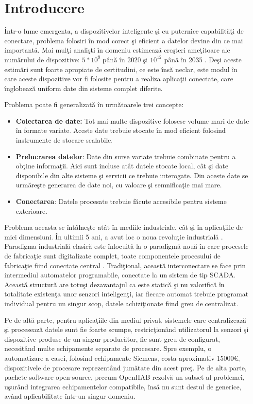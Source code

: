 \chapter{Introducere}

Într-o lume emergenta, a dispozitivelor inteligente şi cu puternice capabilităţi de conectare, problema folosiri în mod corect şi eficient a datelor devine din ce mai importantă. Mai mulţi analişti în domeniu estimează creşteri ameţitoare ale numărului de dispozitive: $5*10^9$ până în 2020 şi $10^{12}$ până în 2035 \autocite{iotGrowth}. Deşi aceste estimări sunt foarte apropiate de certitudini, ce este însă neclar, este modul în care aceste dispozitive vor fi folosite pentru a realiza aplicaţii conectate, care înglobează uniform date din sisteme complet diferite.

Problema poate fi generalizată în următoarele trei concepte:
\begin{itemize}
	\item  \textbf{Colectarea de date:} Tot mai multe dispozitive folosesc volume mari de date în formate variate. Aceste date trebuie stocate în mod eficient folosind instrumente de stocare scalabile. 
	\item \textbf{Prelucrarea datelor}: Date din surse variate trebuie combinate pentru a obţine informaţii. Aici sunt incluse atât datele stocate local, cât şi date disponibile din alte sisteme şi servicii ce trebuie interogate. Din aceste date se urmăreşte generarea de date noi, cu valoare şi semnificaţie mai mare.
	\item \textbf{Conectarea}: Datele procesate trebuie făcute accesibile pentru sisteme exterioare.
\end{itemize}

Problema aceasta se întâlneşte atât în mediile industriale, cât şi în aplicaţiile de mici dimensiuni. 
În ultimii 5 ani, a avut loc o noua revoluţie industrială \autocite{ptc} . Paradigma industrială clasică este înlocuită la o paradigmă nouă în care procesele de fabricaţie sunt digitalizate complet, toate componentele procesului de fabricaţie fiind conectate central \autocite{deloitteReport}. 
Tradiţional, această interconectare se face prin intermediul automatelor programabile, conectate la un sistem de tip SCADA. Această structură are totuşi dezavantajul ca este statică şi nu valorifică în totalitate existenţa unor senzori inteligenţi, iar fiecare automat trebuie programat individual pentru un singur scop, datele achiziţionate fiind greu de centralizat.

Pe de altă parte, pentru aplicaţiile din mediul privat, sistemele care centralizează şi procesează datele sunt fie foarte scumpe, restricţionând utilizatorul la senzori şi dispozitive produse de un singur producător, fie sunt greu de configurat, necesitând multe echipamente separate de procesare. Spre exemplu, o automatizare a casei, folosind echipamente Siemens, costa aproximativ 15000\euro, dispozitivele de procesare reprezentând jumătate din acest preţ. Pe de alta parte, pachete software open-source, precum OpenHAB \autocite{openHab} rezolvă un subset al problemei, uşurând integrarea echipamentelor compatibile, însă nu sunt destul de generice, având aplicabilitate într-un singur domeniu.

